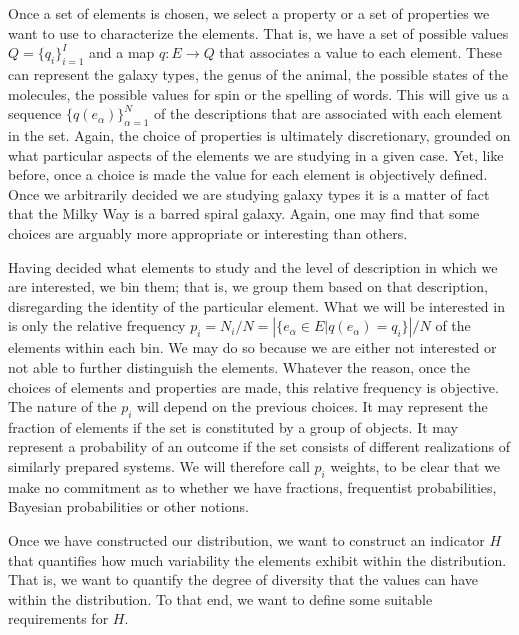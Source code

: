 \documentclass[iopart]{revtex4-1}
\begin{document}
Once a set of elements is chosen, we select a property or a set of properties we want to use to characterize the elements. That is, we have a set of possible values $Q=\{q_i\}_{i=1}^I$ and a map $q : E \to Q$ that associates a value to each element. These can represent the galaxy types, the genus of the animal, the possible states of the molecules, the possible values for spin or the spelling of words. This will give us a sequence $\{q(e_\alpha)\}_{\alpha=1}^N$ of the descriptions that are associated with each element in the set. Again, the choice of properties is ultimately discretionary, grounded on what particular aspects of the elements we are studying in a given case. Yet, like before, once a choice is made the value for each element is objectively defined. Once we arbitrarily decided we are studying galaxy types it is a matter of fact that the Milky Way is a barred spiral galaxy. Again, one may find that some choices are arguably more appropriate or interesting than others.

Having decided what elements to study and the level of description in which we are interested, we bin them; that is, we group them based on that description, disregarding the identity of the particular element. What we will be interested in is only the relative frequency $p_i = N_i / N = \left| \{e_\alpha \in E | q(e_\alpha) = q_i \} \right| / N$ of the elements within each bin. We may do so because we are either not interested or not able to further distinguish the elements. Whatever the reason, once the choices of elements and properties are made, this relative frequency is objective. The nature of the $p_i$ will depend on the previous choices. It may represent the fraction of elements if the set is constituted by a group of objects. It may represent a probability of an outcome if the set consists of different realizations of similarly prepared systems. We will therefore call $p_i$ weights, to be clear that we make no commitment as to whether we have fractions, frequentist probabilities, Bayesian probabilities or other notions.

Once we have constructed our distribution, we want to construct an indicator $H$ that quantifies how much variability the elements exhibit within the distribution. That is, we want to quantify the degree of diversity that the values can have within the distribution. To that end, we want to define some suitable requirements for $H$.
\end{document}
